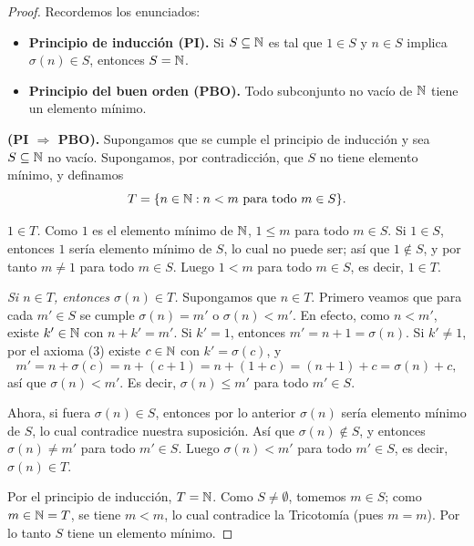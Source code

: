 \documentclass[12pt,a4paper]{article}
\begin{document}
    \begin{proof}
        Recordemos los enunciados:
        \begin{itemize}
            \item \textbf{Principio de inducción (PI).} Si $S\subseteq\mathbb{N}$ es tal que $1\in S$ y $n\in S$ implica
            $\sigma(n)\in S$, entonces $S=\mathbb{N}$.
            \item \textbf{Principio del buen orden (PBO).} Todo subconjunto no vacío de $\mathbb{N}$ tiene un elemento mínimo.
        \end{itemize}

        \textbf{(PI $\Rightarrow$ PBO).} Supongamos que se cumple el principio de inducción y sea $S\subseteq\mathbb{N}$ no
        vacío. Supongamos, por contradicción, que $S$ no tiene elemento mínimo, y definamos
        \begin{equation*}
            T=\{n\in\mathbb{N} : n<m \text{ para todo } m\in S\}.
        \end{equation*}

        \emph{$1\in T$.} Como $1$ es el elemento mínimo de $\mathbb{N}$, $1\le m$ para todo $m\in S$. Si $1\in S$, entonces $1$
        sería elemento mínimo de $S$, lo cual no puede ser; así que $1\notin S$, y por tanto $m\neq1$ para todo $m\in S$.
        Luego $1<m$ para todo $m\in S$, es decir, $1\in T$.

        \emph{Si $n\in T$, entonces $\sigma(n)\in T$.} Supongamos que $n\in T$. Primero veamos que para cada
        $m'\in S$ se cumple $\sigma(n)=m'$ o $\sigma(n)<m'$. En efecto, como $n<m'$, existe $k'\in\mathbb{N}$ con $n+k'=m'$.
        Si $k'=1$, entonces $m'=n+1=\sigma(n)$. Si $k'\neq1$, por el axioma (3) existe $c\in\mathbb{N}$ con $k'=\sigma(c)$, y
        \begin{equation*}
            m'=n+\sigma(c)=n+(c+1)=n+(1+c)=(n+1)+c=\sigma(n)+c,
        \end{equation*}
        así que $\sigma(n)<m'$. Es decir, $\sigma(n)\le m'$ para todo $m'\in S$.

        Ahora, si fuera $\sigma(n)\in S$, entonces por lo anterior $\sigma(n)$ sería elemento mínimo de $S$, lo cual
        contradice nuestra suposición. Así que $\sigma(n)\notin S$, y entonces $\sigma(n)\neq m'$ para todo $m'\in S$.
        Luego $\sigma(n)<m'$ para todo $m'\in S$, es decir, $\sigma(n)\in T$.

        Por el principio de inducción, $T=\mathbb{N}$. Como $S\neq\emptyset$, tomemos $m\in S$; como $m\in\mathbb{N}=T$, se tiene
        $m<m$, lo cual contradice la Tricotomía (pues $m=m$). Por lo tanto $S$ tiene un elemento mínimo.


\end{proof}
\end{document}
